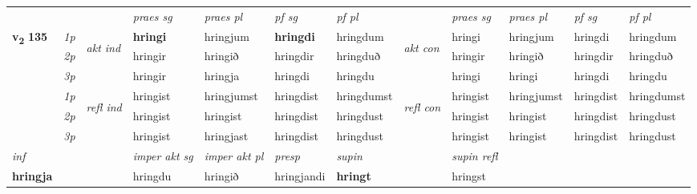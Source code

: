 \begin{longtable}[l]{X>{\footnotesize\itshape}llXXXXlXXXX}
 & &   & \textit{praes sg}  & \textit{praes pl}    & \textit{ pf sg} & \textit{pf pl} & & \textit{praes sg}  & \textit{praes pl}    & \textit{pf sg} & \textit{pf pl }  \\ \cmidrule{4-7} \cmidrule{9-12}
 \multirow{2}{*}{{{\textbf{v{\textsubscript{2}}} \Large{\textbf{135}}}}}  & 1p & \multirow{3}{*}{\begin{turn}{90}\textit{akt ind}\end{turn}} & \textbf{hringi} & hringjum & \textbf{hringdi} & hringdum & \multirow{3}{*}{\begin{turn}{90}\textit{akt con}\end{turn}} &hringi & hringjum & hringdi & hringdum\\*
 & 2p &  &  hringir  & hringið & hringdir & hringduð & & hringir & hringið & hringdir & hringduð \\*
 & 3p &  & hringir & hringja & hringdi & hringdu & & hringi & hringi& hringdi & hringdu \\*
\cmidrule{4-7} \cmidrule{9-12}
 & 1p & \multirow{3}{*}{\begin{turn}{90}\textit{refl ind}\end{turn}}  & hringist & hringjumst & hringdist & hringdumst & \multirow{3}{*}{\begin{turn}{90}\textit{refl con}\end{turn}}  &hringist & hringjumst & hringdist & hringdumst \\*
 & 2p &  & hringist & hringist & hringdist & hringdust & &hringist & hringist & hringdist & hringdust \\*
 & 3p  & & hringist & hringjast & hringdist & hringdust & & hringist & hringist& hringdist & hringdust \\*
\cmidrule{4-7} \cmidrule{9-12}

   {\textit{inf}} & &  & \textit{imper akt sg} & \textit{imper akt pl}   & \textit{presp} & \textit{supin} && \textit{supin refl}  \\*
  {\textbf{hringja}} & && hringdu  & hringið   & hringjandi &  \textbf{hringt} && hringst  \\*

\midrule


\end{longtable}
